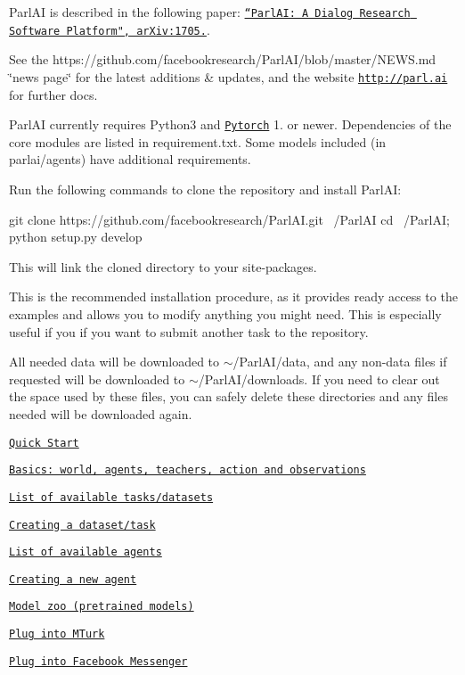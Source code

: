 Parl\+AI is described in the following paper\+: \href{https://arxiv.org/abs/1705.06476}{\tt “\+Parl\+A\+I\+: A Dialog Research Software Platform", ar\+Xiv\+:1705.}.

See the https\+://github.com/facebookresearch/\+Parl\+A\+I/blob/master/\+N\+E\+W\+S.\+md \char`\"{}news page\char`\"{} for the latest additions \& updates, and the website \href{http://parl.ai}{\tt http\+://parl.\+ai} for further docs.

Parl\+AI currently requires Python3 and \href{https://pytorch.org}{\tt Pytorch} 1. or newer. Dependencies of the core modules are listed in {\ttfamily requirement.\+txt}. Some models included (in {\ttfamily parlai/agents}) have additional requirements.

Run the following commands to clone the repository and install Parl\+AI\+:


\begin{DoxyCode}
git clone https://github.com/facebookresearch/ParlAI.git ~/ParlAI
cd ~/ParlAI; python setup.py develop
\end{DoxyCode}


This will link the cloned directory to your site-\/packages.

This is the recommended installation procedure, as it provides ready access to the examples and allows you to modify anything you might need. This is especially useful if you if you want to submit another task to the repository.

All needed data will be downloaded to {\ttfamily $\sim$/\+Parl\+A\+I/data}, and any non-\/data files if requested will be downloaded to {\ttfamily $\sim$/\+Parl\+A\+I/downloads}. If you need to clear out the space used by these files, you can safely delete these directories and any files needed will be downloaded again.


\begin{DoxyItemize}
\item \href{https://parl.ai/docs/tutorial_quick.html}{\tt Quick Start}
\item \href{https://parl.ai/docs/tutorial_basic.html}{\tt Basics\+: world, agents, teachers, action and observations}
\item \href{https://parl.ai/docs/tasks.html}{\tt List of available tasks/datasets}
\item \href{http://www.parl.ai/docs/tutorial_task.html}{\tt Creating a dataset/task}
\item \href{./parlai/agents}{\tt List of available agents}
\item \href{https://parl.ai/docs/tutorial_seq2seq.html#}{\tt Creating a new agent}
\item \href{https://parl.ai/docs/zoo.html}{\tt Model zoo (pretrained models)}
\item \href{http://parl.ai/docs/tutorial_mturk.html}{\tt Plug into M\+Turk}
\item \href{http://parl.ai/docs/tutorial_messenger.html}{\tt Plug into Facebook Messenger}
\end{DoxyItemize}

